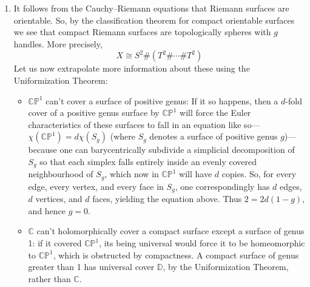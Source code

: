 \documentclass[11pt,a4paper]{article}
\begin{document}
\begin{enumerate}
So, $\mathbb{CP}^n$ has only even-dimensional cells. This allows us to calculate its homology groups:
\begin{equation*}
    H_k(\mathbb{CP}^n) = \begin{cases}
            \mathbb{Z},& \text{ if } 2|k, \text{ }0\leq k\leq 2n\\
            0, & \text{ else}
            \end{cases}
\end{equation*}
Further, $\mathbb{CP}^n$ sits in the following fibre sequence:
\begin{equation*}
    S^1 \rightarrow S^{2n+1} \rightarrow \mathbb{CP}^n
\end{equation*}
which yields the following long exact sequence of homotopy groups:
\begin{equation*}
    \cdots \rightarrow \pi_k(S^1) \rightarrow \pi_k(S^{2n+1}) \rightarrow \pi_k(\mathbb{CP}^n) \rightarrow \pi_{k-1}(S^1) \rightarrow \ldots
\end{equation*}
Now, using the fact that $\pi_k(S^1) = 0$ for $k>1$, one can know about projective spaces just as much as one knows about spheres.
\item It follows from the Cauchy--Riemann equations that Riemann surfaces are orientable. So, by the classification theorem for compact orientable surfaces we see that compact Riemann surfaces are topologically spheres with $g$ handles. More precisely,
\begin{equation*}
    X \cong S^2 \# (T^2 \#\cdots \#T^2)
\end{equation*}
Let us now extrapolate more information about these using the Uniformization Theorem:
\begin{itemize}
    \item $\mathbb{CP}^1$ can't cover a surface of positive genus: If it so happens, then a $d$-fold cover of a positive genus surface by $\mathbb{CP}^1$ will force the Euler characteristics of these surfaces to fall in an equation like so---$\chi(\mathbb{CP}^1) = d\chi(S_g)$ (where $S_g$ denotes a surface of positive genus $g$)---because one can barycentrically subdivide a simplicial decomposition of $S_g$ so that each simplex falls entirely inside an evenly covered neighbourhood of $S_g$, which now in $\mathbb{CP}^1$ will have $d$ copies. So, for every edge, every vertex, and every face in $S_g$, one correspondingly has $d$ edges, $d$ vertices, and $d$ faces, yielding the equation above. Thus $2=2d(1-g)$, and hence $g=0$.
    \item $\mathbb{C}$ can't holomorphically cover a compact surface except a surface of genus 1: if it covered $\mathbb{CP}^1$, its being universal would force it to be homeomorphic to $\mathbb{CP}^1$, which is obstructed by compactness. A compact surface of genus greater than 1 has universal cover $\mathbb D$, by the Uniformization Theorem, rather than $\mathbb C$.
\end{itemize}



\end{enumerate}
\end{document}
